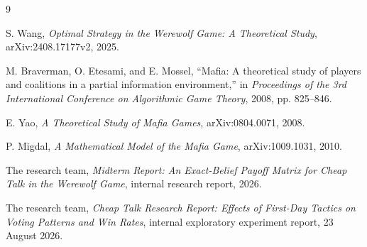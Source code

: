 \documentclass[11pt,a4paper]{article}
\begin{document}
\begin{thebibliography}{9}

S. Wang,
\emph{Optimal Strategy in the Werewolf Game: A Theoretical Study},
arXiv:2408.17177v2, 2025.

M. Braverman, O. Etesami, and E. Mossel,
``Mafia: A theoretical study of players and coalitions in a partial information environment,''
in \emph{Proceedings of the 3rd International Conference on Algorithmic Game Theory}, 2008, pp. 825--846.

E. Yao,
\emph{A Theoretical Study of Mafia Games},
arXiv:0804.0071, 2008.

P. Migdal,
\emph{A Mathematical Model of the Mafia Game},
arXiv:1009.1031, 2010.

The research team,
\emph{Midterm Report: An Exact-Belief Payoff Matrix for Cheap Talk in the Werewolf Game},
internal research report, 2026.

The research team,
\emph{Cheap Talk Research Report: Effects of First-Day Tactics on Voting Patterns and Win Rates},
internal exploratory experiment report, 23 August 2026.

\end{thebibliography}
\end{document}
